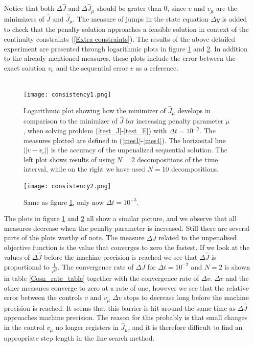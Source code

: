 Notice that both $\Delta\hat J$ and $\Delta \hat J_{\mu}$ should be grater than $0$, since $v$ and $v_{\mu}$ are the minimizers of $\hat J$ and $\hat J_ {\mu}$. The measure of jumps in the state equation $\Delta y$ is added to check that the penalty solution approaches a feasible solution in context of the continuity constraints (\ref{Extra constraints}). The results of the above detailed experiment are presented through logarithmic plots in figure \ref{Cons1_fig} and \ref{Cons2_fig}. In addition to the already mentioned measures, these plots include the error between the exact solution $v_e$ and the sequential error $v$ as a reference.
\\
\\
\begin{figure}[!h]
\centering
\texttt{[image: consistency1.png]}
\caption{Logarithmic plot showing how the minimizer of $\hat J_{\mu}$ develops in comparison to the minimizer of $\hat J$ for increasing penalty parameter $\mu$, when solving problem (\ref{test_J}-\ref{test_E}) with $\Delta t = 10^{-2}$. The measures plotted are defined in (\ref{mes1}-\ref{mes4}). The horizontal line $||v-v_e||$ is the accuracy of the unpenalized sequential solution. The left plot shows results of using $N=2$ decompositions of the time interval, while on the right we have used $N=10$ decompositions.}
\label{Cons1_fig}
\end{figure}
\begin{figure}[!h]
\centering
\texttt{[image: consistency2.png]}
\caption{Same as figure \ref{Cons1_fig}, only now $\Delta t = 10^{-3}$.}
\label{Cons2_fig}
\end{figure}
The plots in figure \ref{Cons1_fig} and \ref{Cons2_fig} all show a similar picture, and we observe that all measures decrease when the penalty parameter is increased. Still there are several parts of the plots worthy of note. The measure $\Delta\hat J$ related to the unpenalised objective function is the value that converges to zero the fastest. If we look at the values of $\Delta\hat J$ before the machine precision is reached we see that $\Delta \hat J$ is proportional to $\frac{1}{\mu^2}$. The convergence rate of $\Delta\hat J$ for $\Delta t=10^{-2}$ and $N=2$ is shown in table \ref{Cosn_rate_table} together with the convergence rate of $\Delta v$. $\Delta v$ and the other measures converge to zero at a rate of one, however we see that the relative error between the controls $v$ and $v_{\mu}$ $\Delta v$ stops to decrease long before the machine precision is reached. It seems that this barrier is hit around the same time as $\Delta\hat J$ approaches machine precision. The reason for this probably is that small changes in the control $v_{\mu}$ no longer registers in $\hat J_{\mu}$, and it is therefore difficult to find an appropriate step length in the line search method.

